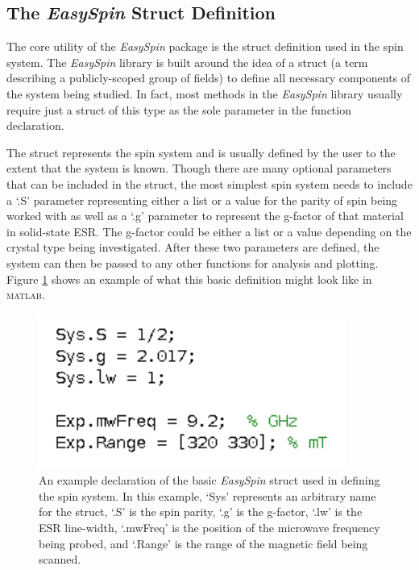 \documentclass[oneside, astronomy, noacknowlegments]{BYUPhys}
\begin{document}
\subsection{The \textit{EasySpin} Struct Definition}

The core utility of the \textit{EasySpin} package is the struct definition used in the spin system. The \textit{EasySpin} library is built around the idea of a struct (a term describing a publicly-scoped group of fields) to define all necessary components of the system being studied. In fact, most methods in the \textit{EasySpin} library usually require just a struct of this type as the sole parameter in the function declaration.

The struct represents the spin system and is usually defined by the user to the extent that the system is known. Though there are many optional parameters that can be included in the struct, the most simplest spin system needs to include a `.S' parameter representing either a list or a value for the parity of spin being worked with as well as a `.g' parameter to represent the g-factor of that material in solid-state ESR. The g-factor could be either a list or a value depending on the crystal type being investigated. After these two parameters are defined, the system can then be passed to any other functions for analysis and plotting. Figure \ref{fig:SpinDefinition} shows an example of what this basic definition might look like in \textsc{matlab}.

\begin{figure}
    \centerline{\includegraphics{example_params_fig}}
    \caption[Simple Spin System Definition]{\label{fig:SpinDefinition}
     An example declaration of the basic \textit{EasySpin} struct used in defining the spin system. In this example, `Sys' represents an arbitrary name for the struct, `.S' is the spin parity, `.g' is the g-factor, `.lw' is the ESR line-width, `.mwFreq' is the position of the microwave frequency being probed, and `.Range' is the range of the magnetic field being scanned.}
 \end{figure}
\end{document}
